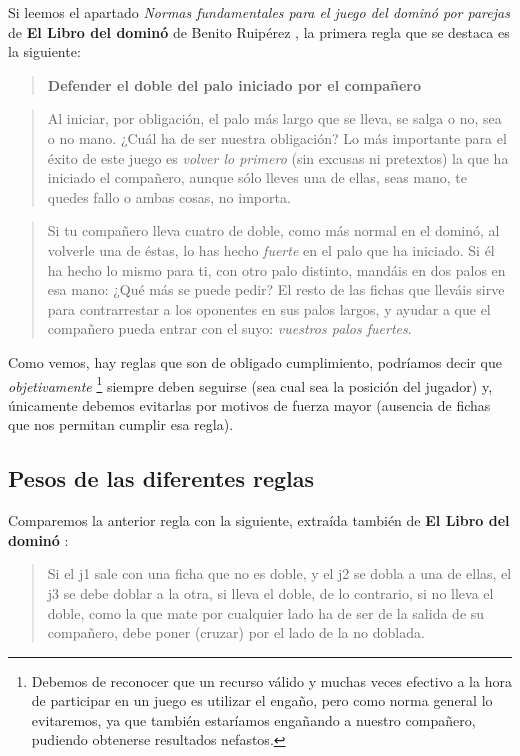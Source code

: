 Si leemos el apartado \emph{Normas fundamentales para el juego del dominó por parejas} de \textbf{El Libro del dominó} de
Benito Ruipérez \cite{mora90}, la primera regla que se destaca es la siguiente:

\begin{quote}
    \textbf{Defender el doble del palo iniciado por el compañero} 
\end{quote}
\begin{quote}
    Al iniciar, por obligación, el palo más largo que se lleva, se salga o no, sea o no mano. ¿Cuál ha de ser nuestra
    obligación? Lo más importante para el éxito de este juego es \emph{volver lo primero} (sin excusas ni pretextos)
    la que ha iniciado el compañero, aunque sólo lleves una de ellas, seas mano, te quedes fallo o ambas cosas, no importa.
\end{quote}
\begin{quote}
    Si tu compañero lleva cuatro de doble, como más normal en el dominó, al volverle una de éstas, lo has hecho \emph{fuerte}
    en el palo que ha iniciado. Si él ha hecho lo mismo para ti, con otro palo distinto, mandáis en dos palos en
    esa mano: ¿Qué más se puede pedir? El resto de las fichas que lleváis sirve para contrarrestar a los oponentes en sus
    palos largos, y ayudar a que el compañero pueda entrar con el suyo: \emph{vuestros palos fuertes}.
\end{quote}

Como vemos, hay reglas que son de obligado cumplimiento, podríamos decir que \emph{objetivamente} \footnote{Debemos de
reconocer que un recurso válido y muchas veces efectivo a la hora de participar en un juego es utilizar el engaño, pero
como norma general lo evitaremos, ya que también estaríamos engañando a nuestro compañero, pudiendo obtenerse resultados
nefastos.} siempre deben seguirse (sea cual sea la posición del jugador) y, únicamente debemos evitarlas por motivos de
fuerza mayor (ausencia de fichas que nos permitan cumplir esa regla).

\subsection{Pesos de las diferentes reglas}

Comparemos la anterior regla con la siguiente, extraída también de \textbf{El Libro del dominó} \cite{mora90}:

\begin{quote}
    Si el j1 sale con una ficha que no es doble, y el j2 se dobla a una de ellas, el j3 se debe doblar a la otra, si
    lleva el doble, de lo contrario, si no lleva el doble, como la que mate por cualquier lado ha de ser de la
    salida de su compañero, debe poner (cruzar) por el lado de la no doblada.
\end{quote}

